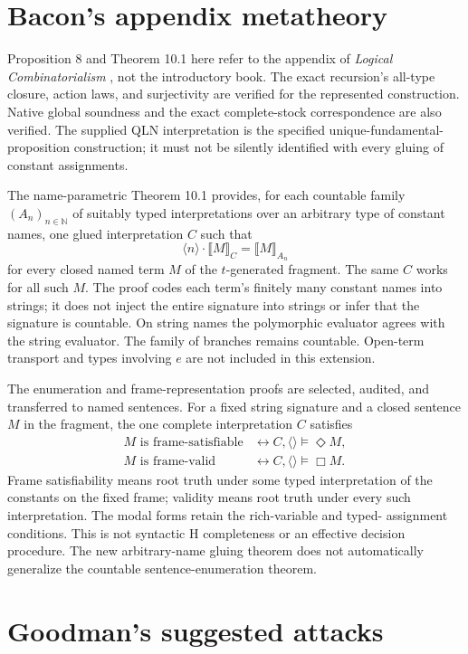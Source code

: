 \documentclass[12pt,leqno]{article}
\newcommand{\IFF}{\ensuremath{\leftrightarrow}}
\newcommand{\sem}[1]{\ensuremath{\llbracket #1\rrbracket}}
\begin{document}
\section{Bacon's appendix metatheory}

Proposition 8 and Theorem 10.1 here refer to the appendix of
\emph{Logical Combinatorialism} \cite{bacon}, not the introductory book.
The exact recursion's all-type closure, action laws, and surjectivity are
verified for the represented construction. Native global soundness and
the exact complete-stock correspondence are also verified. The supplied
QLN interpretation is the specified unique-fundamental-proposition
construction; it must not be silently identified with every gluing of
constant assignments.

The name-parametric Theorem 10.1 provides, for each countable family
$(A_n)_{n\in\mathbb N}$ of suitably typed interpretations over an
arbitrary type of constant names, one glued interpretation $C$ such that
\[
 \langle n\rangle\cdot\sem{M}_C=\sem{M}_{A_n}
\]
for every closed named term $M$ of the $t$-generated fragment. The same
$C$ works for all such $M$. The proof codes each term's finitely many
constant names into strings; it does not inject the entire signature
into strings or infer that the signature is countable. On string names
the polymorphic evaluator agrees with the string evaluator. The family of branches
remains countable. Open-term transport and types involving $e$ are not
included in this extension.

The enumeration and frame-representation proofs are selected,
audited, and transferred to named sentences. For a fixed string signature
and a closed sentence $M$ in the fragment, the one complete interpretation
$C$ satisfies
\[
\begin{aligned}
 M\text{ is frame-satisfiable}
     &\IFF C,\langle\rangle\models\Diamond M,\\
 M\text{ is frame-valid}
     &\IFF C,\langle\rangle\models\Box M.
\end{aligned}
\]
Frame satisfiability means root truth under some typed interpretation of
the constants on the fixed frame; validity means root truth under every
such interpretation. The modal forms retain the rich-variable and typed-
assignment conditions. This is not syntactic H completeness or an effective
decision procedure. The new arbitrary-name gluing theorem does not
automatically generalize the countable sentence-enumeration theorem.

\section{Goodman's suggested attacks}
\label{sec:attacks}
\end{document}
